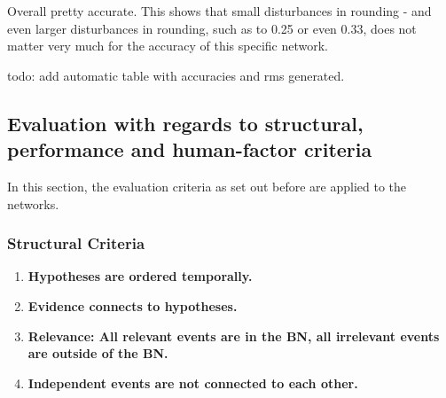 


Overall pretty accurate. This shows that small disturbances in rounding - and even larger disturbances in rounding, such as to 0.25 or even 0.33, does not matter very much for the accuracy of this specific network. 

{\color{red} todo: add automatic table with accuracies and rms generated}.

\subsection{Evaluation with regards to structural, performance and human-factor criteria}
In this section, the evaluation criteria as set out before are applied to the networks.

\subsubsection{Structural Criteria}
\begin{enumerate}
\item \textbf{Hypotheses are ordered temporally.}
\item \textbf{Evidence connects to hypotheses.}
\item \textbf{Relevance: All relevant events are in the BN, all irrelevant events are outside of the BN.}
\item \textbf{Independent events are not connected to each other.}
\end{enumerate}


